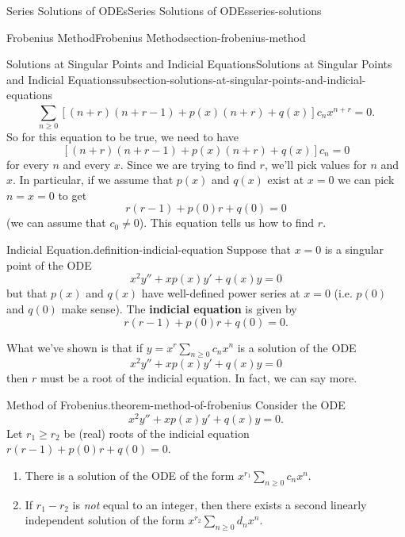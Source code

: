 \documentclass[oneside,10pt,]{book}
\newcommand{\terminology}[1]{\textbf{#1}}
\numberwithin{equation}{section}
\begin{document}
\begin{chapterptx}{Series Solutions of ODEs}{}{Series Solutions of ODEs}{}{}{series-solutions}
\begin{sectionptx}{Frobenius Method}{}{Frobenius Method}{}{}{section-frobenius-method}
\begin{subsectionptx}{Solutions at Singular Points and Indicial Equations}{}{Solutions at Singular Points and Indicial Equations}{}{}{subsection-solutions-at-singular-points-and-indicial-equations}
\begin{equation*}
\sum_{n\geq0}^{}\left[(n+r)(n+r-1)+p(x)(n+r)+q(x)\right]c_{n}x^{n+r} = 0.
\end{equation*}
So for this equation to be true, we need to have%
\begin{equation*}
\left[(n+r)(n+r-1)+p(x)(n+r)+q(x)\right]c_{n} = 0
\end{equation*}
for every \(n\) and every \(x\). Since we are trying to find \(r\), we'll pick values for \(n\) and \(x\). In particular, if we assume that \(p(x)\) and \(q(x)\) exist at \(x=0\) we can pick \(n=x=0\) to get%
\begin{equation*}
r(r-1)+p(0)r+q(0) = 0
\end{equation*}
(we can assume that \(c_{0}\neq0\)). This equation tells us how to find \(r\).%
\begin{definition}{Indicial Equation.}{definition-indicial-equation}%
\hypertarget{p-476}{}%
Suppose that \(x=0\) is a singular point of the ODE%
\begin{equation*}
x^{2}y''+xp(x)y'+q(x)y=0
\end{equation*}
but that \(p(x)\) and \(q(x)\) have well-defined power series at \(x=0\) (i.e. \(p(0)\) and \(q(0)\) make sense). The \terminology{indicial equation} is given by%
\begin{equation*}
r(r-1)+p(0)r+q(0) = 0.
\end{equation*}
%
\end{definition}
\hypertarget{p-477}{}%
What we've shown is that if \(y=x^{r}\sum_{n\geq0}^{}c_{n}x^{n}\) is a solution of the ODE%
\begin{equation*}
x^{2}y''+xp(x)y'+q(x)y=0
\end{equation*}
then \(r\) must be a root of the indicial equation. In fact, we can say more.%
\begin{theorem}{Method of Frobenius.}{}{theorem-method-of-frobenius}%
\hypertarget{p-478}{}%
Consider the ODE%
\begin{equation*}
x^{2}y''+xp(x)y'+q(x)y=0.
\end{equation*}
Let \(r_{1}\geq r_{2}\) be (real) roots of the indicial equation \(r(r-1)+p(0)r+q(0)=0\).\leavevmode%
\begin{enumerate}
\item\hypertarget{li-29}{}\hypertarget{p-479}{}%
There is a solution of the ODE of the form \(x^{r_{1}}\sum_{n\geq0}^{}c_{n}x^{n}\).%
\item\hypertarget{li-30}{}\hypertarget{p-480}{}%
If \(r_{1}-r_{2}\) is \emph{not} equal to an integer, then there exists a second linearly independent solution of the form \(x^{r_{2}}\sum_{n\geq0}^{}d_{n}x^{n}\).%

\end{enumerate}
\end{theorem}
\end{subsectionptx}
\end{sectionptx}
\end{chapterptx}
\end{document}
